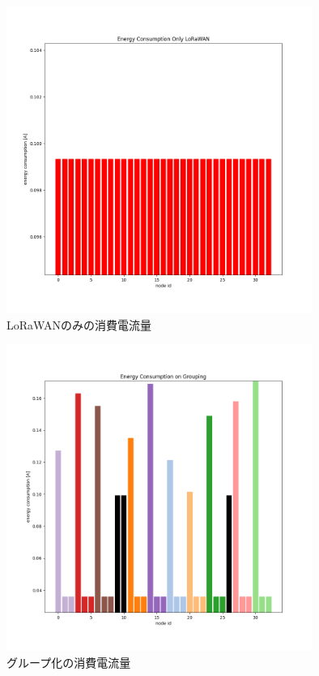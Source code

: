 \documentclass[Japanese]{dicomopapers}
\begin{document}
\begin{figure}[h]
    \centering
    \includegraphics[width=10cm]{img/lorawan_energy_consumption.png}
    \caption{LoRaWANのみの消費電流量}
    \label{energy_consumption_only_lorawan}
\end{figure}

\begin{figure}[h]
    \centering
    \includegraphics[width=10cm]{img/group_energy_consumption_without_eq.png}
    \caption{グループ化の消費電流量}
    \label{energy_consumption_grouping_without_eq}
\end{figure}
\end{document}
